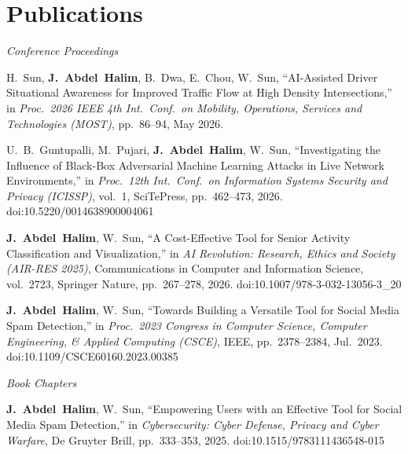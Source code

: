 \documentclass[11pt,letterpaper]{article}
\newcommand{\me}{\textbf{J.~Abdel~Halim}}
\begin{document}
\section{Publications}
\textit{Conference Proceedings}
\begin{enumerate}[label={[C\arabic*]}, leftmargin=2.6em, itemsep=3pt, topsep=3pt]
  \item H.~Sun, \me, B.~Dwa, E.~Chou, W.~Sun, ``AI-Assisted Driver Situational
        Awareness for Improved Traffic Flow at High Density Intersections,''
        in \textit{Proc.\ 2026 IEEE 4th Int.\ Conf.\ on Mobility, Operations, Services
        and Technologies (MOST)}, pp.~86--94, May 2026.
  \item U.~B.~Guntupalli, M.~Pujari, \me, W.~Sun, ``Investigating the Influence of
        Black-Box Adversarial Machine Learning Attacks in Live Network Environments,''
        in \textit{Proc.\ 12th Int.\ Conf.\ on Information Systems Security and Privacy
        (ICISSP)}, vol.~1, SciTePress, pp.~462--473, 2026. doi:10.5220/0014638900004061
  \item \me, W.~Sun, ``A Cost-Effective Tool for Senior Activity Classification and
        Visualization,'' in \textit{AI Revolution: Research, Ethics and Society
        (AIR-RES 2025)}, Communications in Computer and Information Science, vol.~2723,
        Springer Nature, pp.~267--278, 2026. doi:10.1007/978-3-032-13056-3\_20
  \item \me, W.~Sun, ``Towards Building a Versatile Tool for Social Media Spam
        Detection,'' in \textit{Proc.\ 2023 Congress in Computer Science, Computer
        Engineering, \& Applied Computing (CSCE)}, IEEE, pp.~2378--2384, Jul.\ 2023.
        doi:10.1109/CSCE60160.2023.00385
\end{enumerate}

\textit{Book Chapters}
\begin{enumerate}[label={[B\arabic*]}, leftmargin=2.6em, itemsep=3pt, topsep=3pt]
  \item \me, W.~Sun, ``Empowering Users with an Effective Tool for Social Media Spam
        Detection,'' in \textit{Cybersecurity: Cyber Defense, Privacy and Cyber
        Warfare}, De Gruyter Brill, pp.~333--353, 2025.
        doi:10.1515/9783111436548-015
\end{enumerate}

\end{document}
